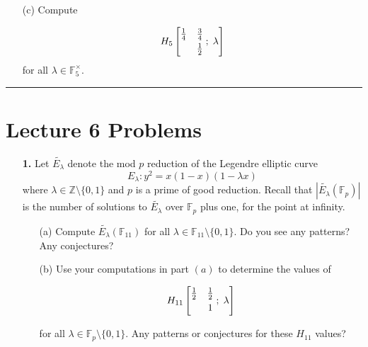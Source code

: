 \documentclass[12pt]{amsart}
\theoremstyle{definition}
\theoremstyle{remark}
\numberwithin{equation}{section}
\def \l {\lambda}
\def\F{{\mathbb F}}
\def\Z{{\mathbb Z}}
\def \l {\lambda}
\def\Z{\mathbb{Z}}
\def\F{\mathbb{F}}
\newcommand{\fp}
{\mathbb{F}_p}
\begin{document}
\begin{itemize}
\begin{itemize}
\begin{itemize}
\vspace{4mm}

\item[(c)] Compute 

$$H_{5}\left[\begin{matrix} \frac{1}{4} & \frac{3}{4} \smallskip \\   & \frac{1}{2} \end{matrix} \; ; \; \l \right]$$ for all $\l \in \mathbb{F}_{5}^{\times}$.
\end{itemize}

\vspace{8mm}

\hrule{}

\vspace{8mm}

\section*{Lecture 6 Problems}

\begin{itemize}
\item[\textbf{1.}] Let $\tilde{E_{\l}}$ denote the mod $p$ reduction of the Legendre elliptic curve 
$$E_{\l}: y^{2} = x(1-x)(1-\l x)$$ where $\l \in \Z \setminus \{0,1\}$ and $p$ is a prime of good reduction. Recall that $|\tilde{E_{\l}}(\fp)|$ is the number of solutions to $\tilde{E_{\l}}$ over $\fp$ plus one, for the point at infinity.

\vspace{4mm}

\begin{itemize}
\item[(a)] Compute $\tilde{E_{\l}}(\mathbb{F}_{11})$ for all $\l \in \F_{11} \setminus \{0,1\}$. Do you see any patterns? Any conjectures?

\vspace{4mm}

\item[(b)] Use your computations in part $(a)$ to determine the values of 

$$H_{11}\left[\begin{matrix} \frac{1}{2} & \frac{1}{2} \smallskip \\   & 1 \end{matrix} \; ; \; \l \right]$$

for all $\l \in \fp \setminus \{0,1\}$. Any patterns or conjectures for these $H_{11}$ values?

\vspace{4mm}


\end{itemize}
\end{itemize}
\end{itemize}
\end{itemize}
\end{document}
